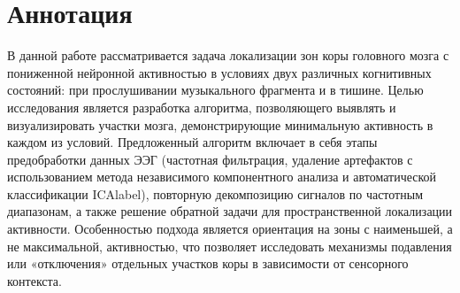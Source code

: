 \chapter*{Аннотация}
\label{ch:annotation}
В данной работе рассматривается задача локализации зон коры головного мозга с пониженной нейронной активностью в условиях двух различных когнитивных состояний: при прослушивании музыкального фрагмента и в тишине. Целью исследования является разработка алгоритма, позволяющего выявлять и визуализировать участки мозга, демонстрирующие минимальную активность в каждом из условий. Предложенный алгоритм включает в себя этапы предобработки данных ЭЭГ (частотная фильтрация, удаление артефактов с использованием метода независимого компонентного анализа и автоматической классификации ICAlabel), повторную декомпозицию сигналов по частотным диапазонам, а также решение обратной задачи для пространственной локализации активности.
Особенностью подхода является ориентация на зоны с наименьшей, а не максимальной, активностью, что позволяет исследовать механизмы подавления или «отключения» отдельных участков коры в зависимости от сенсорного контекста.
\vspace*{-\baselineskip}
